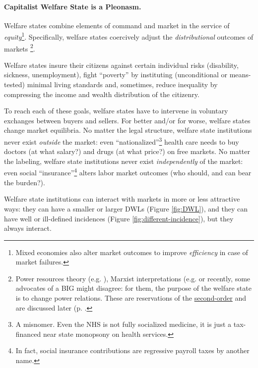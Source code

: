 \paragraph{Capitalist Welfare State is a Pleonasm.}  \label{sec:interface} Welfare states combine elements of  command and market in the service of \emph{equity}\footnote
	{Mixed economies also alter market outcomes to improve \emph{efficiency} in case of market failures.}. 
Specifically, welfare states coercively adjust the \emph{distributional} outcomes of markets \footnote
	{Power resources theory (e.g. \citealt{Korpi2003}), Marxist interpretations (e.g. \cite{Offe1972} or recently, some advocates of a \gls{BIG} might disagree: for them, the purpose of the welfare state is to change power relations. These are reservations of the \hyperref[sec:whodunnit]{second-order} and are discussed later (p. \pageref{sec:whodunnit}.}.

Welfare states insure their citizens against certain individual risks (disability, sickness, unemployment), fight ``poverty'' by instituting (unconditional or means-tested) minimal living standards and, sometimes, reduce inequality by compressing the income and wealth distribution of the citizenry.

To reach each of these goals, welfare states have to intervene in voluntary exchanges between buyers and sellers. For better and/or for worse, welfare states change market equilibria. No matter the legal structure, welfare state institutions never exist \emph{outside} the market: even ``nationalized''\footnote
	{A misnomer. Even the \gls{NHS} is not fully socialized medicine, it is just a tax-financed near state monopsony on health services.} 
health care needs to buy doctors (at what salary?) and drugs (at what price?) on free markets. No matter the labeling, welfare state institutions never exist \emph{independently} of the market: even social ``insurance''\footnote
	{In fact, social insurance contributions are regressive payroll taxes by another name.} alters labor market outcomes (who should, and can bear the burden?). 

Welfare state institutions can interact with markets in more or less attractive ways: they can have a smaller or larger \glspl{DWL} (Figure \ref{fig:DWL}), and they can have well or ill-defined incidences (Figure \ref{fig:different-incidence}), but they always interact.%

